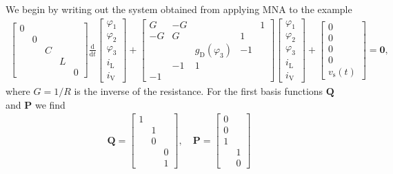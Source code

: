 \documentclass[AMA,STIX1COL]{WileyNJD-v2}
\newcommand{\mb}[1]{\mathbf{#1}}
\newcommand{\mr}[1]{\mathrm{#1}}
\newcommand{\ddt}{\frac{\mathrm{d}}{\mathrm{d}t}}
\begin{document}
We begin by writing out the system obtained from applying MNA to the example
\begin{align*}
    \begin{bmatrix}
        0 & & & &\\
        & 0 & & &\\
        & & C & &\\
        & & & L &\\
        & & & & 0
    \end{bmatrix} \ddt \begin{bmatrix}
        \varphi_1\\
        \varphi_2\\
        \varphi_3\\
        i_\mr{L}\\
        i_\mr{V}
    \end{bmatrix} + \begin{bmatrix}
        G & -G & &  & 1\\
        -G & G & & 1 &\\
        & & g_\mr{D}(\varphi_3) & -1 &\\
        & -1 & 1 & &\\
        -1 & & & &
    \end{bmatrix} \begin{bmatrix}
        \varphi_1\\
        \varphi_2\\
        \varphi_3\\
        i_\mr{L}\\
        i_\mr{V}
    \end{bmatrix} + \begin{bmatrix}
        0\\
        0\\
        0\\
        0\\
        v_\mr{s}(t)
    \end{bmatrix} = \mb{0},
\end{align*}
where $G = 1/R$ is the inverse of the resistance. For the first basis functions $\mb{Q}$ and $\mb{P}$ we find
\begin{align*}
    \mb{Q} = \begin{bmatrix}
        1 & &\\
        & 1 &\\
        & 0 &\\
        & & 0\\
        & & 1
    \end{bmatrix}, \quad \mb{P} = \begin{bmatrix}
        0 &\\
        0 &\\
        1 &\\
        & 1\\
        & 0
    \end{bmatrix}
\end{align*}
\end{document}
